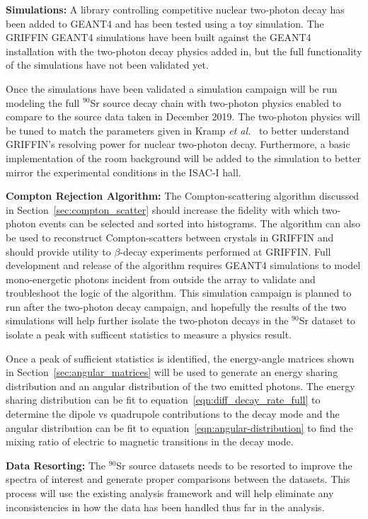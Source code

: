 \documentclass[cnatzke_thesis_proposal.tex]{subfiles}
\begin{document}
\textbf{Simulations:} A library controlling competitive nuclear two-photon decay has been added to GEANT4 and has been tested using a toy simulation.
The GRIFFIN GEANT4 simulations have been built against the GEANT4 installation with the two-photon decay physics added in, but the full functionality of the simulations have not been validated yet.

Once the simulations have been validated a simulation campaign will be run modeling the full $^{90}$Sr source decay chain with two-photon physics enabled to compare to the source data taken in December 2019. 
The two-photon physics will be tuned to match the parameters given in Kramp \textit{et al.}~\cite{kramp_nuclear_1987} to better understand GRIFFIN's resolving power for nuclear two-photon decay. 
Furthermore, a basic implementation of the room background will be added to the simulation to better mirror the experimental conditions in the ISAC-I hall. 

\textbf{Compton Rejection Algorithm:} The Compton-scattering algorithm discussed in Section~\ref{sec:compton_scatter} should increase the fidelity with which two-photon events can be selected and sorted into histograms. 
The algorithm can also be used to reconstruct Compton-scatters between crystals in GRIFFIN and should provide utility to $\beta$-decay experiments performed at GRIFFIN. 
Full development and release of the algorithm requires GEANT4 simulations to model mono-energetic photons incident from outside the array to validate and troubleshoot the logic of the algorithm.
This simulation campaign is planned to run after the two-photon decay campaign, and hopefully the results of the two simulations will help further isolate the two-photon decays in the $^{90}$Sr dataset to isolate a peak with sufficent statistics to measure a physics result. 

Once a peak of sufficient statistics is identified, the energy-angle matrices shown in Section~\ref{sec:angular_matrices} will be used to generate an energy sharing distribution and an angular distribution of the two emitted photons.
The energy sharing distribution can be fit to equation~\ref{eqn:diff_decay_rate_full} to determine the dipole vs quadrupole contributions to the decay mode and the angular distribution can be fit to equation~\ref{eqn:angular-distribution} to find the mixing ratio of electric to magnetic transitions in the decay mode. 

\textbf{Data Resorting:} The $^{90}$Sr source datasets needs to be resorted to improve the spectra of interest and generate proper comparisons between the datasets. 
This process will use the existing analysis framework and will help eliminate any inconsistencies in how the data has been handled thus far in the analysis. 
\end{document}
